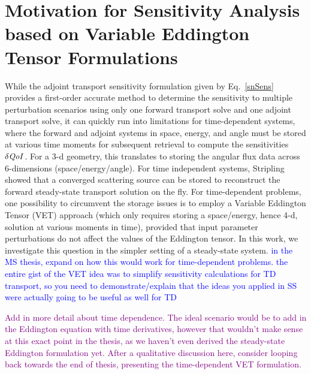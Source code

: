 \documentclass[12pt]{report}
\newcommand{\qoi}{{\it QoI}\xspace}
\newcommand{\comment}[2]{\marginpar{\textcolor{#2}{$\star$}}\textcolor{#2}{#1}\newline}
\newcommand{\jcr}[1]{\comment{#1}{blue}}
\newcommand{\todo}[1]{\comment{#1}{purple}}
\newcommand{\jcr}[1]{\phantom{a}}
\newcommand{\todo}[1]{\phantom{a}}
\begin{document}
\section{Motivation for Sensitivity Analysis based on Variable Eddington Tensor Formulations}

While the adjoint transport sensitivity formulation given by Eq.~\eqref{snSens} provides a first-order accurate method to determine the sensitivity to multiple perturbation scenarios using only one forward transport solve and one adjoint transport solve, it can quickly run into limitations for time-dependent systems, where the forward and adjoint systems in space, energy, and angle must be stored at various time moments for subsequent retrieval to compute the sensitivities $\delta \qoi$. For a 3-d geometry, this translates to storing the angular
flux data across 6-dimensions (space/energy/angle). For time independent systems, Stripling \cite{Stripling} showed that a converged scattering source can be stored to reconstruct 
the forward steady-state transport solution on the fly. For time-dependent problems, one possibility to circumvent the storage issues is to employ a Variable Eddington Tensor (VET) approach (which only requires
storing a space/energy, hence 4-d, solution at various moments in time), provided that input parameter perturbations do not affect the values of the Eddington tensor. In this work,
we investigate this question in the simpler setting of a steady-state system.
\jcr{in the MS thesis, expand on how this would work for time-dependent problems. the entire
gist of the VET idea was to simplify sensitivity calculations for TD transport, so you need
to demonstrate/explain that the ideas you applied in SS were actually going to be useful as well for TD}

\todo{Add in more detail about time dependence. The ideal scenario would be to add in the Eddington equation with time derivatives, however that wouldn't make sense at this exact point in the thesis, as we haven't even derived the steady-state Eddington formulation yet. After a qualitative discussion here, consider looping back towards the end of thesis, presenting the time-dependent VET formulation.}
\end{document}
